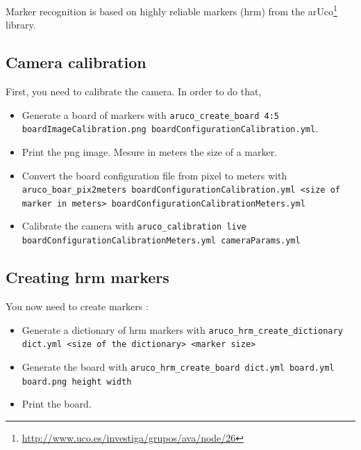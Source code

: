 \documentclass[a4paper,11pt]{report}
\begin{document}
Marker recognition is based on highly reliable markers (hrm) from the
arUco\footnote{\url{http://www.uco.es/investiga/grupos/ava/node/26}}
library.

\subsection{Camera calibration}
\label{subsec:cam}

First, you need to calibrate the camera. In order to do that, \begin{itemize}

    \item Generate a board of markers with \texttt{aruco\_create\_board 4:5
        boardImageCalibration.png boardConfigurationCalibration.yml}.

    \item Print the png image. Mesure in meters the size of a marker.

    \item Convert the board configuration file from pixel to meters with
        \texttt{aruco\_boar\_pix2meters boardConfigurationCalibration.yml <size
        of marker in meters> boardConfigurationCalibrationMeters.yml}

    \item Calibrate the camera with \texttt{aruco\_calibration live
        boardConfigurationCalibrationMeters.yml cameraParams.yml}

\end{itemize}

\subsection{Creating hrm markers}
\label{subsec:dic}

You now need to create markers : \begin{itemize}

    \item Generate a dictionary of hrm markers with
        \texttt{aruco\_hrm\_create\_dictionary dict.yml <size of the
        dictionary> <marker size>}

    \item Generate the board with \texttt{aruco\_hrm\_create\_board dict.yml
        board.yml board.png height width}

    \item Print the board.

\end{itemize}
\end{document}
